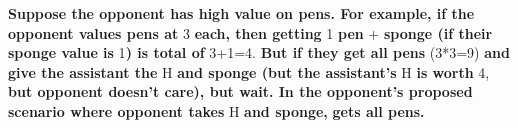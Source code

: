 \documentclass{article}
\newcommand{\cen}[1]{\textbf{\textcolor{English}{#1}}}
\newcommand{\czh}[1]{\textbf{\textcolor{Chinese}{\textchinese{#1}}}}
\begin{document}
\newpage
\color{Neutral}
\cen{Suppose the opponent has high value on pens. For example, if the opponent values pens at} 3 \cen{each, then getting} 1 \cen{pen} + \cen{sponge (if their sponge value is} 1\cen{) is total of} 3+1=4. \cen{But if they get all pens} (3*3=9) \cen{and give the assistant the} H \cen{and sponge (but the assistant's} H \cen{is worth} 4, \cen{but opponent doesn't care), but wait. In the opponent's proposed scenario where opponent takes} H \cen{and sponge,}\czh{助理} \cen{gets all pens.}
\end{document}
